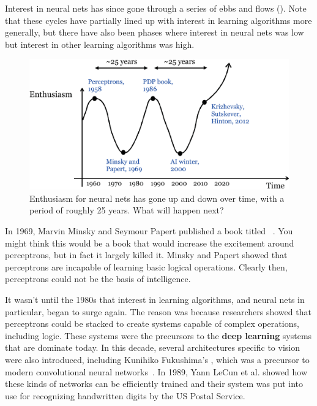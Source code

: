 
Interest in neural nets has since gone through a series of ebbs and flows (\fig{\ref{fig:taxonomy:neural_net_enthusiam}}). Note that these cycles have partially lined up with interest in learning algorithms more generally, but there have also been phases where interest in neural nets was low but interest in other learning algorithms was high.

\begin{figure}[t]
\centerline{
\includegraphics[width=0.7\linewidth]{figures/taxonomy/neural_net_enthusiasm.eps}
} 
\caption{Enthusiasm for neural nets has gone up and down over time, with a period of roughly 25 years. What will happen next?} 
\label{fig:taxonomy:neural_net_enthusiam}
\end{figure}


In 1969, Marvin Minsky and Seymour Papert published a book titled ~\cite{marvin1969perceptrons}. You might think this would be a book that would increase the excitement around perceptrons, but in fact it largely killed it. Minsky and Papert showed that perceptrons are incapable of learning basic logical operations. Clearly then, perceptrons could not be the basis of intelligence.

It wasn't until the 1980s that interest in learning algorithms, and neural nets in particular, began to surge again. The reason was because researchers showed that perceptrons could be stacked to create systems capable of complex operations, including logic. These systems were the precursors to the {\bf deep learning} systems that are dominate today. In this decade, several architectures specific to vision were also introduced, including Kunihiko Fukushima's , which was a precursor to modern convolutional neural networks~\cite{fukushima1980neocognitron}. In 1989, Yann LeCun et al. showed how these kinds of networks can be efficiently trained \cite{lecun1989backpropagation} and their system was put into use for recognizing handwritten digits by the US Postal Service.


